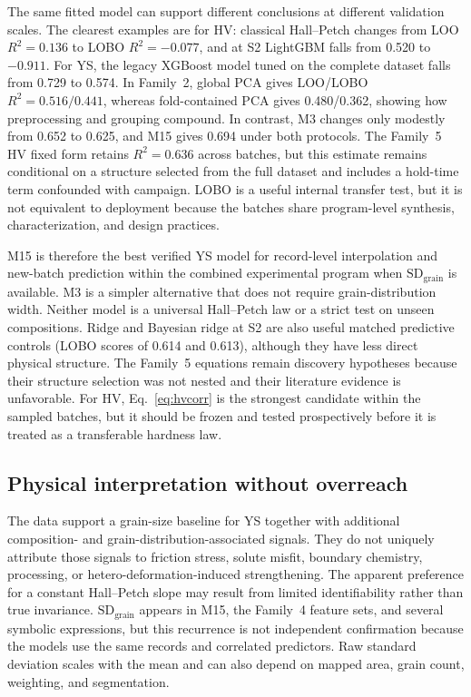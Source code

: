 \documentclass[5p,times,twocolumn]{elsarticle}
\begin{document}
The same fitted model can support different conclusions at different validation scales. The clearest examples are for HV: classical Hall--Petch changes from LOO $R^2=0.136$ to LOBO $R^2=-0.077$, and at S2 LightGBM falls from 0.520 to $-0.911$. For YS, the legacy XGBoost model tuned on the complete dataset falls from 0.729 to 0.574. In Family~2, global PCA gives LOO/LOBO $R^2=0.516/0.441$, whereas fold-contained PCA gives 0.480/0.362, showing how preprocessing and grouping compound. In contrast, M3 changes only modestly from 0.652 to 0.625, and M15 gives 0.694 under both protocols. The Family~5 HV fixed form retains $R^2=0.636$ across batches, but this estimate remains conditional on a structure selected from the full dataset and includes a hold-time term confounded with campaign. LOBO is a useful internal transfer test, but it is not equivalent to deployment because the batches share program-level synthesis, characterization, and design practices.

M15 is therefore the best verified YS model for record-level interpolation and new-batch prediction within the combined experimental program when $\mathrm{SD}_{\mathrm{grain}}$ is available. M3 is a simpler alternative that does not require grain-distribution width. Neither model is a universal Hall--Petch law or a strict test on unseen compositions. Ridge and Bayesian ridge at S2 are also useful matched predictive controls (LOBO scores of 0.614 and 0.613), although they have less direct physical structure. The Family~5 equations remain discovery hypotheses because their structure selection was not nested and their literature evidence is unfavorable. For HV, Eq.~\eqref{eq:hvcorr} is the strongest candidate within the sampled batches, but it should be frozen and tested prospectively before it is treated as a transferable hardness law.

\subsection{Physical interpretation without overreach}

The data support a grain-size baseline for YS together with additional composition- and grain-distribution-associated signals. They do not uniquely attribute those signals to friction stress, solute misfit, boundary chemistry, processing, or hetero-deformation-induced strengthening. The apparent preference for a constant Hall--Petch slope may result from limited identifiability rather than true invariance. $\mathrm{SD}_{\mathrm{grain}}$ appears in M15, the Family~4 feature sets, and several symbolic expressions, but this recurrence is not independent confirmation because the models use the same records and correlated predictors. Raw standard deviation scales with the mean and can also depend on mapped area, grain count, weighting, and segmentation.
\end{document}
